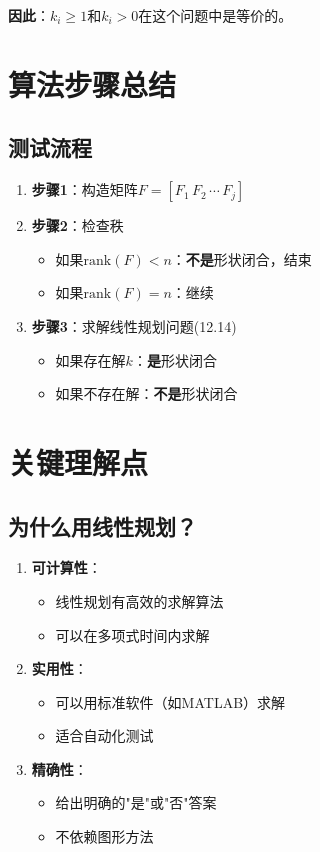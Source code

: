\documentclass[12pt,a4paper]{article}
\begin{document}
\textbf{因此}：$k_i \geq 1$和$k_i > 0$在这个问题中是等价的。

\section{算法步骤总结}

\subsection{测试流程}

\begin{enumerate}
\item \textbf{步骤1}：构造矩阵$F = [F_1 \, F_2 \, \cdots \, F_j]$

\item \textbf{步骤2}：检查秩
   \begin{itemize}
   \item 如果$\text{rank}(F) < n$：\textbf{不是}形状闭合，结束
   \item 如果$\text{rank}(F) = n$：继续
   \end{itemize}

\item \textbf{步骤3}：求解线性规划问题(12.14)
   \begin{itemize}
   \item 如果存在解$k$：\textbf{是}形状闭合
   \item 如果不存在解：\textbf{不是}形状闭合
   \end{itemize}
\end{enumerate}

\section{关键理解点}

\subsection{为什么用线性规划？}

\begin{enumerate}
\item \textbf{可计算性}：
   \begin{itemize}
   \item 线性规划有高效的求解算法
   \item 可以在多项式时间内求解
   \end{itemize}

\item \textbf{实用性}：
   \begin{itemize}
   \item 可以用标准软件（如MATLAB）求解
   \item 适合自动化测试
   \end{itemize}

\item \textbf{精确性}：
   \begin{itemize}
   \item 给出明确的"是"或"否"答案
   \item 不依赖图形方法
   \end{itemize}
\end{enumerate}
\end{document}
